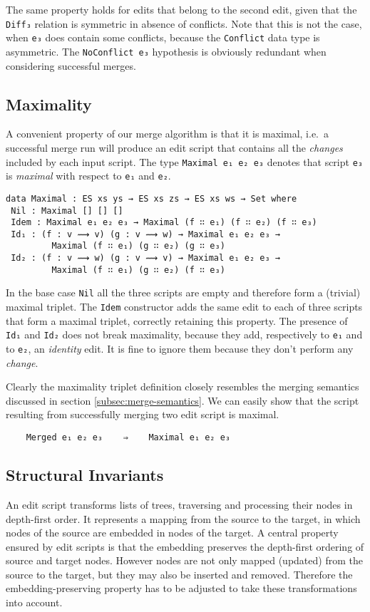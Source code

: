 \documentclass[preprint]{sigplanconf}
\begin{document}
    The same property holds for edits that belong to the second edit, given
    that the \texttt{Diff₃} relation is symmetric in absence of conflicts.	
    Note that this is not the case, when \texttt{e₃} does contain some conflicts,
    because the \texttt{Conflict} data type is asymmetric.
    The \texttt{NoConflict e₃} hypothesis is obviously redundant when
    considering successful merges.
    		
    \subsection{Maximality}
    A convenient property of our merge algorithm is that it is maximal, i.e.\ a successful 
    merge run will produce an edit script that contains all the \emph{changes} included
    by each input script. The type \texttt{Maximal e₁ e₂ e₃} denotes that  
    script \texttt{e₃} is \emph{maximal} with respect to \texttt{e₁} and \texttt{e₂}.
	
\begin{verbatim}
data Maximal : ES xs ys → ES xs zs → ES xs ws → Set where
 Nil : Maximal [] [] []
 Idem : Maximal e₁ e₂ e₃ → Maximal (f ∷ e₁) (f ∷ e₂) (f ∷ e₃)
 Id₁ : (f : v ⟿ v) (g : v ⟿ w) → Maximal e₁ e₂ e₃ → 
         Maximal (f ∷ e₁) (g ∷ e₂) (g ∷ e₃)
 Id₂ : (f : v ⟿ w) (g : v ⟿ v) → Maximal e₁ e₂ e₃ → 
         Maximal (f ∷ e₁) (g ∷ e₂) (f ∷ e₃)
\end{verbatim}

    In the base case \texttt{Nil} all the three scripts
    are empty and therefore form a (trivial) maximal triplet.
    The \texttt{Idem} constructor adds the same edit to each of three scripts 
    that form a maximal triplet, correctly retaining this property.
    The presence of \texttt{Id₁} and \texttt{Id₂} does not break maximality, because
    they add, respectively to \texttt{e₁} and to \texttt{e₂}, an \emph{identity} edit.
    It is fine to ignore them because they don't perform any \emph{change}.

    Clearly the maximality triplet definition closely resembles the merging semantics discussed
    in section \ref{subsec:merge-semantics}. We can easily show that the script resulting from
    successfully merging two edit script is maximal.
\begin{verbatim}
    Merged e₁ e₂ e₃    ⇒    Maximal e₁ e₂ e₃
\end{verbatim}

    \subsection{Structural  Invariants}
    An edit script transforms lists of trees, traversing and processing 
    their nodes in depth-first order.
    It represents a mapping from the source to the target, in which 
    nodes of the source are embedded in nodes of the target.
    A central property ensured by edit scripts is that the 
    embedding preserves the depth-first ordering of source and target nodes.
    However nodes are not only mapped (updated) from the source to the 
    target, but they may also be inserted and removed. 
    Therefore the embedding-preserving property has to be adjusted to
    take these transformations into account.
\end{document}
